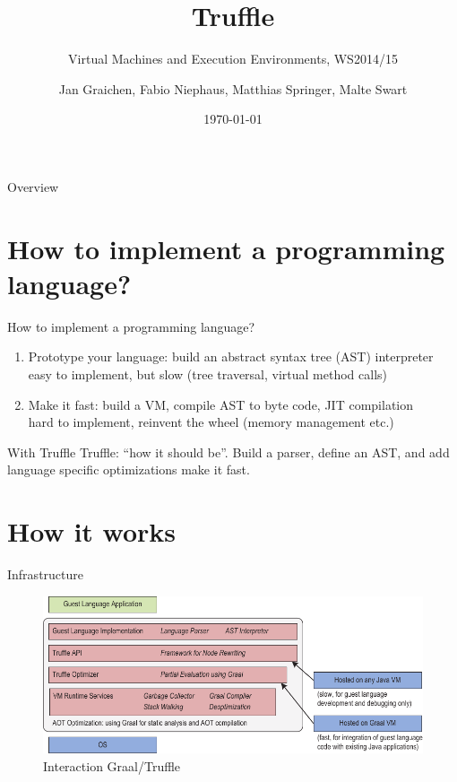 \documentclass[xcolor=dvipsname,handout]{beamer} %
\title{Truffle}
\subtitle{Virtual Machines and Execution Environments, WS2014/15}
\author{Jan Graichen, Fabio Niephaus, Matthias Springer, Malte Swart}
\date{\today}
\institute[2012]{Hasso Plattner Institute, Software Architecture Group}
\begin{document}
\begin{frame}[plain]
	\maketitle
\end{frame}
\begin{frame}{Overview}
	\tableofcontents[hideallsubsections]
\end{frame}

\section{How to implement a programming language?}

\begin{frame}{How to implement a programming language?}
    \begin{enumerate}
        \item Prototype your language: build an abstract syntax tree (AST) interpreter \\
        easy to implement, but slow (tree traversal, virtual method calls)
        \item Make it fast: build a VM, compile AST to byte code, JIT compilation \\
        hard to implement, reinvent the wheel (memory management etc.) 
    \end{enumerate}

    \vfill
    \begin{alertblock}{With Truffle}
        Truffle: ``how it should be''. Build a parser, define an AST, and add language specific optimizations make it fast.
    \end{alertblock}
\end{frame}


\section{How it works}

\begin{frame}{Infrastructure}
	\begin{figure}
        \includegraphics[width=\textwidth]{infrastructure.pdf}
        \caption{Interaction Graal/Truffle}
        \label{fig:interaction}
    \end{figure}
\end{frame}
\end{document}

